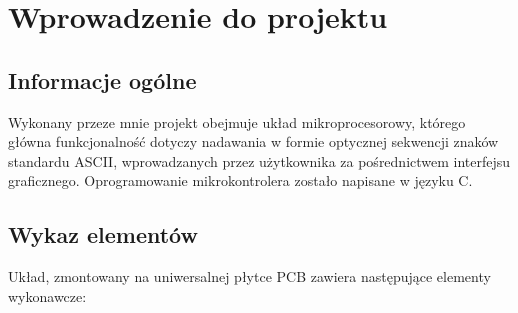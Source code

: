 \documentclass{article}
\begin{document}
\begin{titlepage}
	
	
	
	
	
	
	 
	
	
\end{titlepage}


  \newpage
{}  

\section{Wprowadzenie do projektu}
\subsection{Informacje ogólne}
Wykonany przeze mnie projekt obejmuje układ mikroprocesorowy, którego główna funkcjonalność dotyczy nadawania w formie optycznej sekwencji znaków standardu ASCII, wprowadzanych przez użytkownika za pośrednictwem interfejsu graficznego. Oprogramowanie mikrokontrolera zostało napisane w języku C.
\subsection{Wykaz elementów}
Układ, zmontowany na uniwersalnej płytce PCB zawiera następujące elementy wykonawcze:
\end{document}

